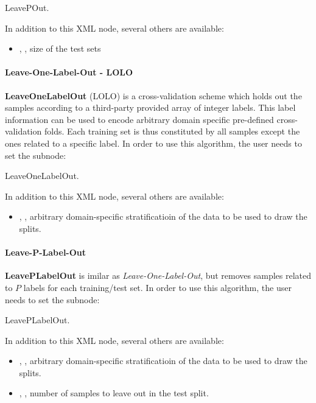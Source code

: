 LeavePOut.

In addition to this XML node, several others are available:
\begin{itemize}
  \item {}, , size of the test sets
\end{itemize}

\paragraph{Leave-One-Label-Out - LOLO}
\textbf{LeaveOneLabelOut} (LOLO) is a cross-validation scheme which holds out the samples according to a third-party
provided array of integer labels. This label information can be used to encode arbitrary domain specific pre-defined
cross-validation folds. Each training set is thus constituted by all samples except the ones related to a specific
label.
In order to use this algorithm, the user needs to set the subnode:

LeaveOneLabelOut.

In addition to this XML node, several others are available:
\begin{itemize}
  \item {}, , arbitrary
    domain-specific stratificatioin of the data to be used to draw the splits.
\end{itemize}

\paragraph{Leave-P-Label-Out}
\textbf{LeavePLabelOut} is imilar as \textit{Leave-One-Label-Out}, but removes samples related to $P$ labels for
each training/test set.
In order to use this algorithm, the user needs to set the subnode:

LeavePLabelOut.

In addition to this XML node, several others are available:
\begin{itemize}
  \item {}, , arbitrary
    domain-specific stratificatioin of the data to be used to draw the splits.
  \item {}, , number of samples to leave out in the test split.
\end{itemize}

